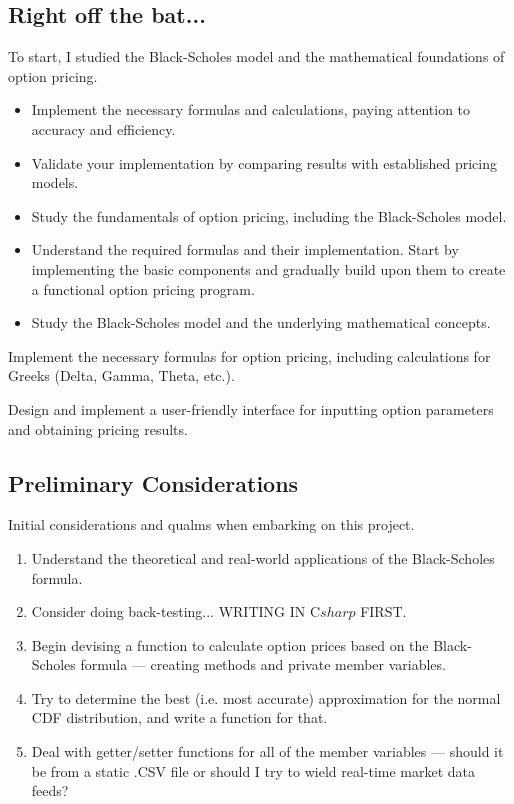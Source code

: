 \documentclass{assignment}
\date{\today}                                   %
\begin{document}
\begin{problem}

\section{Right off the bat...}

\noindent To start, I studied the Black-Scholes model and the mathematical foundations of option pricing. 
\begin{itemize}
    \item Implement the necessary formulas and calculations, paying attention to accuracy and efficiency. 
    \item Validate your implementation by comparing results with established pricing models.
\end{itemize}


\begin{itemize}
    \item Study the fundamentals of option pricing, including the Black-Scholes model. 
    \item Understand the required formulas and their implementation. Start by implementing the basic components and gradually build upon them to create a functional option pricing program.
    \item Study the Black-Scholes model and the underlying mathematical concepts.
\end{itemize}
    

\noindent Implement the necessary formulas for option pricing, including calculations for Greeks (Delta, Gamma, Theta, etc.).

\noindent Design and implement a user-friendly interface for inputting option parameters and obtaining pricing results.

\subsection{Preliminary Considerations}

\noindent Initial considerations and qualms when embarking on this project.

\begin{enumerate}
    \item Understand the theoretical and real-world applications of the Black-Scholes formula. 
    \item Consider doing back-testing... WRITING IN C\(sharp\) FIRST.
    \item Begin devising a function to calculate option prices based on the Black-Scholes formula — creating methods and private member variables.
    \item Try to determine the best (i.e. most accurate) approximation for the normal CDF distribution, and write a function for that.
    \item Deal with getter/setter functions for all of the member variables — should it be from a static .CSV file or should I try to wield real-time market data feeds?
\end{enumerate}


\end{problem}
\end{document}
